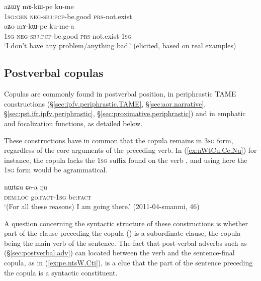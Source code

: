 \begin{exe}
\ex 
\begin{xlist}
\ex \label{ex:mAkWpe.kume}
\gll aʑɯɣ mɤ-kɯ-pe ku-me \\
\textsc{1sg}:\textsc{gen} \textsc{neg}-\textsc{sbj}:\textsc{pcp}-be.good \textsc{prs}-not.exist \\
\ex \label{ex:mAkWpe.kumea}
\gll aʑo mɤ-kɯ-pe ku-me-a \\
 \textsc{1sg}  \textsc{neg}-\textsc{sbj}:\textsc{pcp}-be.good \textsc{prs}-not.exist-\textsc{1sg} \\
 \glt `I don't have any problem/anything bad.' (elicited, based on real examples) 
 \end{xlist} 
\end{exe}


\subsection{Postverbal copulas}  \label{sec:postverbal.copulas}
Copulas are commonly found in postverbal position, in periphrastic TAME constructions (§\ref{sec:ipfv.periphrastic.TAME}, §\ref{sec:aor.narrative}, §\ref{sec:pst.ifr.ipfv.periphrastic}, §\ref{sec:proximative.periphrastic}) and in emphatic and focalization functions, as detailed below.

These constructions have in common that the copula remains in \textsc{3sg} form, regardless of the core arguments of the preceding verb. In (\ref{ex:nWtCu.Ce.Nu}) for instance, the copula  lacks the \textsc{1sg} suffix found on the verb , and using here the \textsc{1sg} form  would be agrammatical.


\begin{exe}
\ex \label{ex:nWtCu.Ce.Nu}
\gll nɯtɕu ɕe-a ŋu \\
\textsc{dem}:\textsc{loc} go:\textsc{fact}-\textsc{1sg} be:\textsc{fact} \\
\glt `(For all these reasons) I am going there.' (2011-04-smanmi, 46)
\end{exe}

A question concerning the syntactic structure of these constructions is whether part of the clause preceding the copula () is a subordinate clause, the copula being the main verb of the sentence. The fact that post-verbal adverbs such as  (§\ref{sec:postverbal.adv}) can located between the verb and the sentence-final copula, as in (\ref{ex:pe.ntsW.Cti}), is a clue that the part of the sentence preceding the copula is a syntactic constituent.

